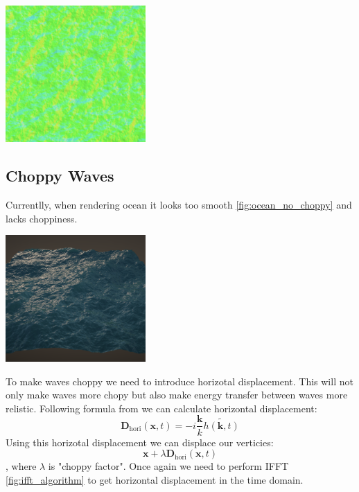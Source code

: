 \begin{minipage}{1\textwidth}
    \centering
    \includegraphics[width=0.40\textwidth]{"images/tma_normal.png"}
    \label{fig:tma_normal_map}
\end{minipage}

\subsection{Choppy Waves}
Currentlly, when rendering ocean it looks too smooth \ref{fig:ocean_no_choppy} and lacks choppiness.

\begin{minipage}{1\textwidth}
    \centering
    \includegraphics[width=0.40\textwidth]{"images/rendered_height_no_coppy.png"}
    \label{fig:ocean_no_choppy}
\end{minipage}

To make waves choppy we need to introduce horizotal displacement. This will not only make waves more chopy but also make energy transfer between waves more relistic. Following formula from \cite[J. Tessendorf]{tessendorf2004} we can calculate horizontal displacement:
\begin{equation}
    \mathbf{D}_{\text{hori}}(\textbf{x}, t) = -i\frac{\mathbf{k}}{k}\tilde{h(\mathbf{k}, t)}
\end{equation}
Using this horizotal displacement we can displace our verticies:
\begin{equation}
    \mathbf{x} + \lambda \mathbf{D}_{\text{hori}}(\textbf{x}, t)
\end{equation}
, where $\lambda$ is "choppy factor".
Once again we need to perform IFFT \ref{fig:ifft_algorithm} to get horizontal displacement in the time domain.

